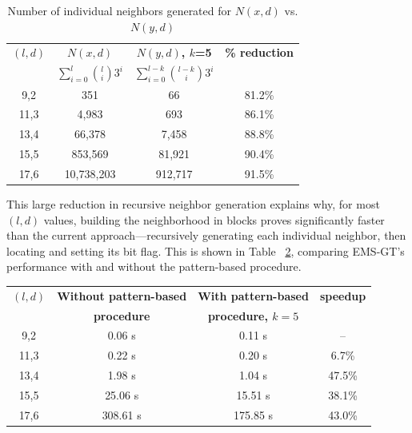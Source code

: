 \documentclass[oneside,12pt]{DISCSthesis}
\begin{document}
{	\begin{table}[h] %
		\renewcommand{\arraystretch}{1.3}
		\label{tbl:neighbors_blockmasking}
		\centering
		\begin{tabular}{|c|c|c|c|}
		\hline 
		\bfseries\boldmath $(l,d)$ & \bfseries\boldmath $N(x,d)$ & \bfseries\boldmath $N(y,d)$, $k$=5 & \bfseries \% reduction\\
		\bfseries & \bfseries\boldmath $\sum_{i=0}^{l} \binom{l}{i} 3^{i}$ & \bfseries\boldmath $\sum_{i=0}^{l-k} \binom{l-k}{i} 3^{i}$ & \\
		\hline
		 9,2 &         351  &       66 & 81.2\%\\
		11,3 &       4,983  &      693 & 86.1\%\\
		13,4 &      66,378  &    7,458 & 88.8\%\\
		15,5 &     853,569  &   81,921 & 90.4\%\\
		17,6 &  10,738,203  &  912,717 & 91.5\%\\
		\hline\end{tabular}

		\caption{Number of individual neighbors generated for $N(x,d)$ vs. $N(y,d)$}
		\end{table}

		This large reduction in recursive neighbor generation explains why, for most $(l,d)$ values, building the neighborhood in blocks proves significantly faster than the current approach---recursively generating each individual neighbor, then locating and setting its bit flag. This is shown in Table ~\ref{tbl:speedup_blockmasking}, comparing EMS-GT's performance with and without the pattern-based procedure.\newline

			\begin{table}[h] %
				\renewcommand{\arraystretch}{1.3}
				\label{tbl:speedup_blockmasking}
				\centering
				\begin{tabular}{|c|c|c|c|}
				\hline 
				\bfseries\boldmath $(l,d)$ & \bfseries Without pattern-based & \bfseries With pattern-based & \bfseries speedup\\
				\bfseries & \bfseries procedure & \bfseries\boldmath procedure, $k=5$ & \bfseries\\
				\hline
				 9,2 &   0.06 s &    0.11 s &     --  \\
				11,3 &   0.22 s &    0.20 s &    6.7\%\\
				13,4 &   1.98 s &    1.04 s &   47.5\%\\
				15,5 &  25.06 s &   15.51 s &   38.1\%\\
				17,6 & 308.61 s &  175.85 s &   43.0\%\\
				\hline\end{tabular}


\end{table}}
\end{document}
